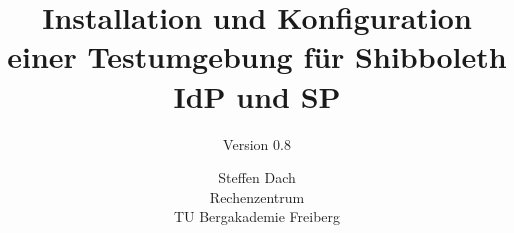 \documentclass[12pt, a4paper]{scrartcl}
\begin{document}
\title{Installation und Konfiguration einer Testumgebung für Shibboleth IdP und
SP}
\subtitle{Version 0.8}
\author{Steffen Dach\\ Rechenzentrum \\ TU Bergakademie Freiberg}
\maketitle

\newpage
\tableofcontents

\newpage




\end{document}
